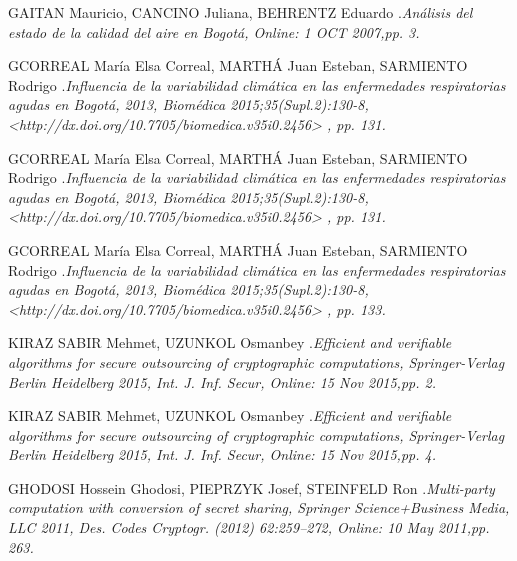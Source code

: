 \documentclass[a4paper, 11pt, oneside]{article}
\theoremstyle{definition}
\theoremstyle{remark}
\begin{document}
\begin{thebibliography}{99}
 GAITAN Mauricio, CANCINO Juliana, BEHRENTZ Eduardo .\emph{Análisis del estado de la calidad del aire en Bogotá, Online: 1 OCT 2007,pp. 3.}

 GCORREAL María Elsa Correal, MARTHÁ Juan Esteban, SARMIENTO Rodrigo .\emph{Influencia de la variabilidad climática en las enfermedades respiratorias agudas en Bogotá, 2013, Biomédica 2015;35(Supl.2):130-8, <http://dx.doi.org/10.7705/biomedica.v35i0.2456> , pp. 131.}

 GCORREAL María Elsa Correal, MARTHÁ Juan Esteban, SARMIENTO Rodrigo .\emph{Influencia de la variabilidad climática en las enfermedades respiratorias agudas en Bogotá, 2013, Biomédica 2015;35(Supl.2):130-8, <http://dx.doi.org/10.7705/biomedica.v35i0.2456> , pp. 131.}

 GCORREAL María Elsa Correal, MARTHÁ Juan Esteban, SARMIENTO Rodrigo .\emph{Influencia de la variabilidad climática en las enfermedades respiratorias agudas en Bogotá, 2013, Biomédica 2015;35(Supl.2):130-8, <http://dx.doi.org/10.7705/biomedica.v35i0.2456> , pp. 133.}

KIRAZ SABIR Mehmet, UZUNKOL Osmanbey .\emph{Efficient and verifiable algorithms for secure outsourcing of cryptographic computations, Springer-Verlag Berlin Heidelberg 2015, Int. J. Inf. Secur, Online: 15 Nov 2015,pp. 2.}

KIRAZ SABIR Mehmet, UZUNKOL Osmanbey .\emph{Efficient and verifiable algorithms for secure outsourcing of cryptographic computations, Springer-Verlag Berlin Heidelberg 2015, Int. J. Inf. Secur, Online: 15 Nov 2015,pp. 4.}

GHODOSI Hossein Ghodosi, PIEPRZYK Josef, STEINFELD Ron .\emph{Multi-party computation with conversion of secret sharing, Springer Science+Business Media, LLC 2011, Des. Codes Cryptogr. (2012) 62:259–272, Online: 10 May 2011,pp. 263.}

\end{thebibliography}
\end{document}
